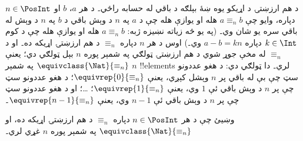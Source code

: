\documentclass[../../../include/open-logic-section]{subfiles}
\begin{document}
\begin{ex}
د هم ارزښتۍ د اړيکو يوه ښۀ بېلګه د باقي له حسابه راځي۔ د هر $a$،
$b$ او $n \in \PosInt$ دپاره، وايو چې $a \equiv_n b$ هله او
يوازې هله چې د $a$ په $n$ د وېش باقي د $b$ په $n$ د وېش له باقي
سره يو شان وي۔ (په يو څه زياته نښيزه ژبه: $a \equiv_n b$ هله او
يوازې هله چې د کوم $k \in \Int$ دپاره $a - b = kn$ وي۔)
اوس د هر $n$ دپاره $\equiv_n$ د هم ارزښتۍ اړيکه ده۔ او د
$\equiv_n$ له مخې جوړ شوي د هم ارزښتۍ ټولګي په شمېر پوره $n$
بېل ټولګي دي؛ يعنې $\equivclass{\Nat}{\equiv_n}$ په شمېر $n$
!!{element}s لري۔ دا ټولګي دي: د هغو عددونو سټ چې بې له باقي پر
$n$ وېشل کېږي، يعنې $\equivrep{0}{\equiv_n}$؛ د هغو عددونو سټ
چې پر $n$ د وېش باقي ئې $1$ وي، يعنې $\equivrep{1}{\equiv_n}$؛
\ldots؛ او د هغو عددونو سټ چې پر $n$ د وېش باقي ئې $n-1$ وي،
يعنې $\equivrep{n-1}{\equiv_n}$۔
\end{ex}

\begin{prob}
وښيئ چې د هر $n \in \PosInt$ دپاره $\equiv_n$ د هم ارزښتۍ
اړيکه ده، او $\equivclass{\Nat}{\equiv_n}$ په شمېر پوره $n$
غړي لري۔
\end{prob}
\end{document}
